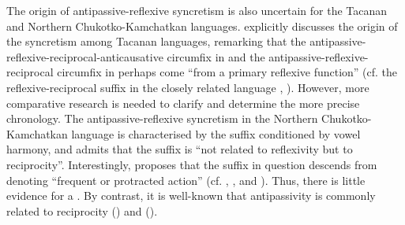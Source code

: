 The origin of antipassive-reflexive syncretism is also uncertain for the Tacanan and Northern Chukotko-Kamchatkan languages. \citet[525]{vuillermet:2012} explicitly discusses the origin of the syncretism among Tacanan languages, remarking that the antipassive-reflexive-reciprocal-anticausative circumfix  in  and the antipassive-reflexive-reciprocal circumfix  in  perhaps come “from a primary reflexive function” (cf. the reflexive-reciprocal suffix  in the closely related language , \citealt[555ff.]{emkow:2006}). However, more comparative research is needed to clarify and determine the more precise chronology. The antipassive-reflexive syncretism in the Northern Chukotko-Kamchatkan language  is characterised by the suffix  conditioned by vowel harmony, and \citet[167]{janic:2010} admits that the suffix is “not related to reflexivity but to reciprocity”. Interestingly, \citet[423]{fortescue:2005} proposes that the suffix in question descends from   denoting “frequent or protracted action” (cf.   ,  , and  ). Thus, there is little evidence for a . By contrast, it is well-known that antipassivity is commonly related to reciprocity () and  (\citealt{polinsky:2017}).

